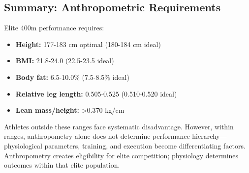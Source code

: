 \subsection{Summary: Anthropometric Requirements}

Elite 400m performance requires:
\begin{itemize}
    \item \textbf{Height:} 177-183 cm optimal (180-184 cm ideal)
    \item \textbf{BMI:} 21.8-24.0 (22.5-23.5 ideal)
    \item \textbf{Body fat:} 6.5-10.0\% (7.5-8.5\% ideal)
    \item \textbf{Relative leg length:} 0.505-0.525 (0.510-0.520 ideal)
    \item \textbf{Lean mass/height:} >0.370 kg/cm
\end{itemize}

Athletes outside these ranges face systematic disadvantage. However, within ranges, anthropometry alone does not determine performance hierarchy—physiological parameters, training, and execution become differentiating factors. Anthropometry creates eligibility for elite competition; physiology determines outcomes within that elite population.
